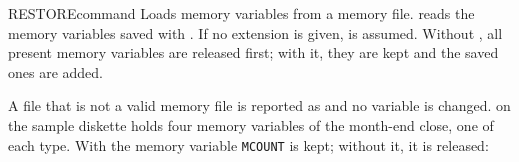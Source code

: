 \begin{XbaseEntry}{RESTORE}{command}
Loads memory variables from a memory file.
\Syntax
{}
\Usage
{} reads the memory variables saved with .  If no
extension is given,  is assumed.  Without , all
present memory variables are released first; with it, they are kept and the
saved ones are added.

A file that is not a valid memory file is reported as
 and no variable is changed.
\Examples
{} on the sample diskette holds four memory variables of the
month-end close, one of each type.  With  the memory variable
\texttt{MCOUNT} is kept; without it, it is released:
\end{XbaseEntry}

